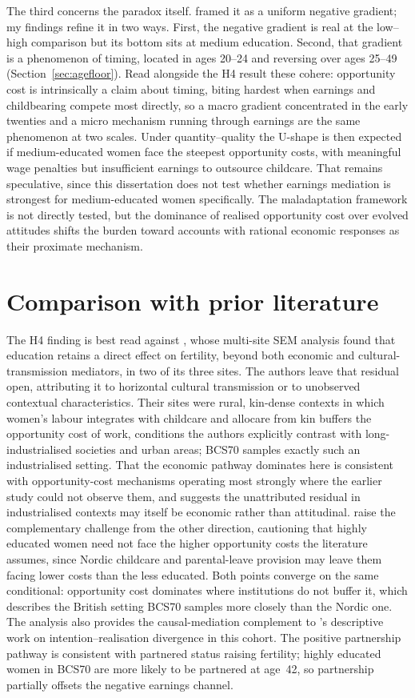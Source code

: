 \documentclass[12pt,a4paper]{report}
\begin{document}
The third concerns the paradox itself. \citet{vining1986} framed it as a uniform negative gradient;
my findings refine it in two ways. First, the negative gradient is real at the low--high comparison
but its bottom sits at medium education. Second, that gradient is a phenomenon of timing, located
in ages 20--24 and reversing over ages 25--49 (Section~\ref{sec:agefloor}). Read alongside the H4
result these cohere: opportunity cost is intrinsically a claim about timing, biting hardest when
earnings and childbearing compete most directly, so a macro gradient concentrated in the early
twenties and a micro mechanism running through earnings are the same phenomenon at two
scales. Under quantity--quality the U-shape is then expected if medium-educated women
face the steepest opportunity costs, with meaningful wage penalties but insufficient earnings to
outsource childcare. That remains speculative, since this dissertation
does not test whether earnings mediation is strongest for medium-educated women specifically. The
maladaptation framework \citep{perusse1993,kanazawa2003} is not directly tested, but the dominance of
realised opportunity cost over evolved attitudes shifts the burden toward accounts with
rational economic responses as their proximate mechanism.

\section{Comparison with prior literature}
The H4 finding is best read against \citet{snopkowski2016}, whose multi-site SEM analysis found that
education retains a direct effect on fertility, beyond both economic and cultural-transmission
mediators, in two of its three sites. The authors leave that residual open, attributing it to
horizontal cultural transmission or to unobserved contextual characteristics. Their sites were rural,
kin-dense contexts in which women's labour integrates with childcare and allocare from kin buffers the
opportunity cost of work, conditions the authors explicitly contrast with long-industrialised
societies and urban areas; BCS70 samples exactly such an industrialised setting. That the economic
pathway dominates here is consistent with opportunity-cost mechanisms operating most strongly where
the earlier study could not observe them, and suggests the unattributed residual in industrialised
contexts may itself be economic rather than attitudinal. \citet{jalovaara2019} raise the complementary
challenge from the other direction, cautioning that highly educated women need not face the higher
opportunity costs the literature assumes, since Nordic childcare and parental-leave provision may
leave them facing lower costs than the less educated. Both points converge on the same conditional:
opportunity cost dominates where institutions do not buffer it, which describes the British setting
BCS70 samples more closely than the Nordic one. The analysis also provides the
causal-mediation complement to
\citet{berrington2017}'s descriptive work on intention--realisation divergence in this cohort. The
positive partnership pathway is consistent with partnered status raising
fertility; highly educated women in BCS70 are more likely to be partnered at age~42, so partnership
partially offsets the negative earnings channel.
\end{document}
